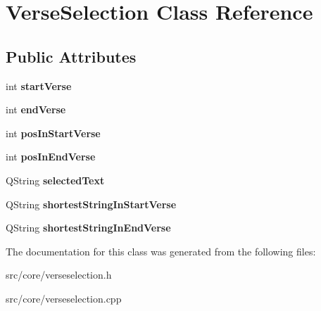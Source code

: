 \hypertarget{classVerseSelection}{
\section{VerseSelection Class Reference}
\label{classVerseSelection}
}
\subsection*{Public Attributes}
\begin{DoxyCompactItemize}
\item 
\hypertarget{classVerseSelection_ade02cd35911d0260c3e82f88ff7b03ca}{
int {\bfseries startVerse}}
\label{classVerseSelection_ade02cd35911d0260c3e82f88ff7b03ca}

\item 
\hypertarget{classVerseSelection_a4aafd7f2f6d85e3d837f2beb36a95d94}{
int {\bfseries endVerse}}
\label{classVerseSelection_a4aafd7f2f6d85e3d837f2beb36a95d94}

\item 
\hypertarget{classVerseSelection_ae33c8b6fceb6b2c78fed4cdbdca658e3}{
int {\bfseries posInStartVerse}}
\label{classVerseSelection_ae33c8b6fceb6b2c78fed4cdbdca658e3}

\item 
\hypertarget{classVerseSelection_a65116d5c98f01e2d456a30c3d82e754f}{
int {\bfseries posInEndVerse}}
\label{classVerseSelection_a65116d5c98f01e2d456a30c3d82e754f}

\item 
\hypertarget{classVerseSelection_af4b4b020fd5d1860b3095ba0011c0891}{
QString {\bfseries selectedText}}
\label{classVerseSelection_af4b4b020fd5d1860b3095ba0011c0891}

\item 
\hypertarget{classVerseSelection_a4e27d6bfbd98e01e7a3418b5e17fb00a}{
QString {\bfseries shortestStringInStartVerse}}
\label{classVerseSelection_a4e27d6bfbd98e01e7a3418b5e17fb00a}

\item 
\hypertarget{classVerseSelection_ad33af6bff0af8737dbe619dbdbd031f0}{
QString {\bfseries shortestStringInEndVerse}}
\label{classVerseSelection_ad33af6bff0af8737dbe619dbdbd031f0}

\end{DoxyCompactItemize}


The documentation for this class was generated from the following files:\begin{DoxyCompactItemize}
\item 
src/core/verseselection.h\item 
src/core/verseselection.cpp\end{DoxyCompactItemize}

